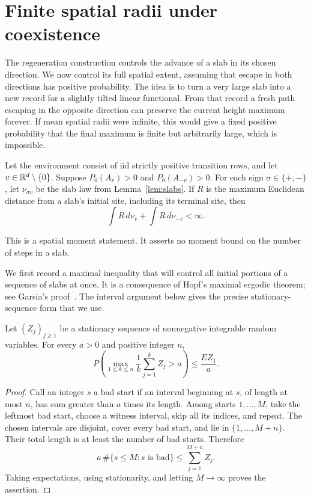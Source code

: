 \section{Finite spatial radii under coexistence}\label{sec:radius}

The regeneration construction controls the advance of a slab in its chosen
direction.  We now control its full spatial extent, assuming that escape in
both directions has positive probability.  The idea is to turn a very large
slab into a new record for a slightly tilted linear functional.  From that
record a fresh path escaping in the opposite direction can preserve the
current height maximum forever.  If mean spatial radii were infinite, this
would give a fixed positive probability that the final maximum is finite
but arbitrarily large, which is impossible.

\begin{proposition}\label{prop:radius}
Let the environment consist of iid strictly positive transition rows,
and let
\(v\in\mathbb R^d\setminus\{0\}\).  Suppose
\(P_0(A_v)>0\) and \(P_0(A_{-v})>0\).  For each sign
\(\sigma\in\{+,-\}\), let \(\nu_{\sigma v}\) be the slab law from
Lemma~\ref{lem:slabs}.  If \(R\) is the maximum Euclidean distance from
a slab's initial site, including its terminal site, then
\[
 \int R\,d\nu_v+\int R\,d\nu_{-v}<\infty.
\]
\end{proposition}

This is a spatial moment statement.  It asserts no moment bound on the
number of steps in a slab.

We first record a maximal inequality that will control all initial portions
of a sequence of slabs at once. It is a consequence of Hopf's maximal
ergodic theorem; see Garsia's proof~\cite{Garsia1965}. The interval argument
below gives the precise stationary-sequence form that we use.

\begin{lemma}\label{lem:initial-averages}
Let \((Z_j)_{j\ge1}\) be a stationary sequence of nonnegative integrable
random variables.  For every \(a>0\) and positive integer \(n\),
\[
 P\left(\max_{1\le k\le n}\frac1k\sum_{j=1}^kZ_j>a\right)
 \le \frac{EZ_1}{a}.
\]
\end{lemma}

\begin{proof}
Call an integer \(s\) a bad start if an interval beginning at \(s\), of
length at most \(n\), has sum greater than \(a\) times its length.
Among starts \(1,\ldots,M\), take the leftmost bad start, choose a
witness interval, skip all its indices, and repeat.  The chosen intervals
are disjoint, cover every bad start, and lie in \(\{1,\ldots,M+n\}\).
Their total length is at least the number of bad starts.  Therefore
\[
 a\,\#\{s\le M:s\text{ is bad}\}
 \le \sum_{j=1}^{M+n}Z_j.
\]
Taking expectations, using stationarity, and letting \(M\to\infty\)
proves the assertion.
\end{proof}

